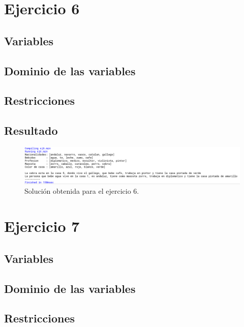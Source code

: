 \documentclass[11pt, spanish]{article}
\begin{document}
\section{Ejercicio 6}

\subsection{Variables}

\subsection{Dominio de las variables}

\subsection{Restricciones}

\subsection{Resultado}


\begin{figure}[H]
  \centering
      \includegraphics[scale = 0.30]{sol6.png}
 		 \caption{Solución obtenida para el ejercicio 6.}
  		\label{fig:ej6}

\end{figure}

\section{Ejercicio 7}

\subsection{Variables}

\subsection{Dominio de las variables}

\subsection{Restricciones}
\end{document}
